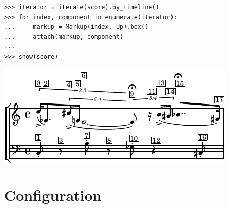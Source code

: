 \documentclass{article}
\begin{document}

\begin{lstlisting}
>>> iterator = iterate(score).by_timeline()
>>> for index, component in enumerate(iterator):
...     markup = Markup(index, Up).box()
...     attach(markup, component)
...
>>> show(score)
\end{lstlisting}
\includegraphics{assets/lilypond-783949753898126e596d11728f72bf61.pdf}

\section{Configuration} \label{sec:configuration}









\end{document}
